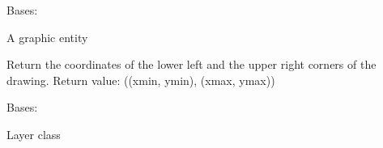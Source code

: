 \documentclass[letterpaper,10pt,english]{sphinxmanual}
\begin{document}
\begin{fulllineitems}
\label{api/gtrace.draw:gtrace.draw.dxf.Entity}
Bases: 

A graphic entity

\begin{fulllineitems}
\label{api/gtrace.draw:gtrace.draw.dxf.Entity.draw}
\end{fulllineitems}


\begin{fulllineitems}
\label{api/gtrace.draw:gtrace.draw.dxf.Entity.report_min_max}
Return the coordinates of the lower left and the upper right corners
of the drawing.
Return value: ((xmin, ymin), (xmax, ymax))

\end{fulllineitems}


\begin{fulllineitems}
\label{api/gtrace.draw:gtrace.draw.dxf.Entity.set_handle}
\end{fulllineitems}


\end{fulllineitems}


\begin{fulllineitems}
\label{api/gtrace.draw:gtrace.draw.dxf.Layer}
Bases: 

Layer class

\begin{fulllineitems}
\label{api/gtrace.draw:gtrace.draw.dxf.Layer.add_entity}
\end{fulllineitems}


\end{fulllineitems}

\end{document}
